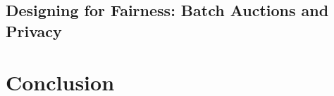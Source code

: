 \documentclass[pdflatex, sn-basic]{sn-jnl}
\theoremstyle{thmstylethree}%
\begin{document}

	\subsection{Designing for Fairness: Batch Auctions and Privacy}
	\label{subsec:market-design}


	\section{Conclusion}
	\label{sec:conclusion}



	
\end{document}
